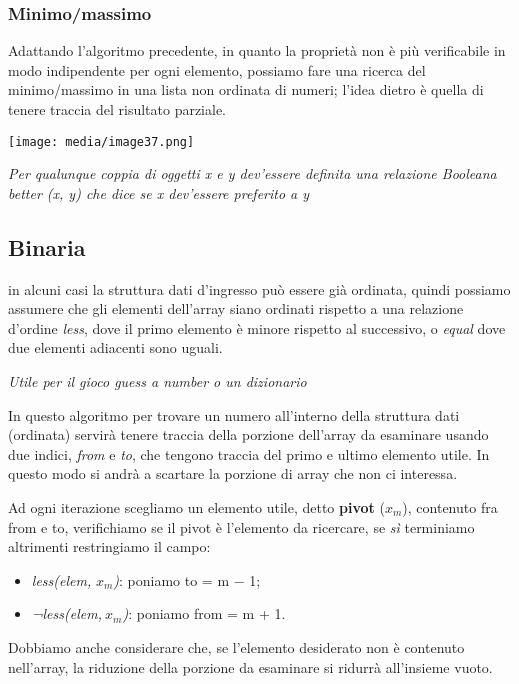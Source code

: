 \subsubsection{Minimo/massimo}\label{minimomassimo}

Adattando l'algoritmo precedente, in quanto la proprietà non è più
verificabile in modo indipendente per ogni elemento, possiamo fare una
ricerca del minimo/massimo in una lista non ordinata di numeri; l'idea
dietro è quella di tenere traccia del risultato parziale.

\texttt{[image: media/image37.png]}

\emph{Per qualunque coppia di oggetti x e y dev'essere definita una
relazione Booleana better (x, y) che dice se x dev'essere preferito a y}

\subsection{Binaria}\label{binaria}

in alcuni casi la struttura dati d'ingresso può essere già ordinata,
quindi possiamo assumere che gli elementi dell'array siano ordinati
rispetto a una relazione d'ordine \emph{less}, dove il primo elemento è
minore rispetto al successivo, o \emph{equal} dove due elementi
adiacenti sono uguali.

\emph{Utile per il gioco guess a number o un dizionario}

In questo algoritmo per trovare un numero all'interno della struttura
dati (ordinata) servirà tenere traccia della porzione dell'array da
esaminare usando due indici, \emph{from} e \emph{to}, che tengono
traccia del primo e ultimo elemento utile. In questo modo si andrà a
scartare la porzione di array che non ci interessa.

Ad ogni iterazione scegliamo un elemento utile, detto \textbf{pivot}
(\(x_{m}\)), contenuto fra from e to, verifichiamo se il pivot è
l'elemento da ricercare, se \emph{sì} terminiamo altrimenti restringiamo
il campo:

\begin{itemize}
\item
  \emph{less(elem,} \(x_{m}\)\emph{)}: poniamo to = m − 1;
\item
  \emph{¬less(elem,}\({\ x}_{m}\)\emph{)}: poniamo from = m + 1.
\end{itemize}

Dobbiamo anche considerare che, se l'elemento desiderato non è contenuto
nell'array, la riduzione della porzione da esaminare si ridurrà
all'insieme vuoto.

